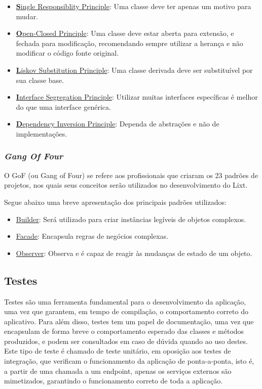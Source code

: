 \begin{itemize}
	\item \underline{\textbf{S}ingle Responsiblity Principle}: Uma classe deve ter apenas um motivo para mudar.
	\item \underline{\textbf{O}pen-Closed Principle}: Uma classe deve estar aberta para extensão, e fechada para modificação, recomendando sempre utilizar a herança e não modificar o código fonte original.
	\item \underline{\textbf{L}iskov Substitution Principle}: Uma classe derivada deve ser substituível por sua classe base.
	\item \underline{\textbf{I}nterface Segregation Principle}: Utilizar muitas interfaces específicas é melhor do que uma interface genérica.
	\item \underline{\textbf{D}ependency Inversion Principle}: Dependa de abstrações e não de implementações.
\end{itemize}

\subsubsection{\emph{Gang Of Four}}

O GoF (ou Gang of Four) se refere aos profissionais que criaram os 23 padrões de projetos, nos quais seus conceitos serão utilizados no desenvolvimento do Lixt.

Segue abaixo uma breve apresentação dos principais padrões utilizados:

\begin{itemize}
	\item \underline{Builder}: Será utilizado para criar instâncias legíveis de objetos complexos.
	\item \underline{Facade}: Encapsula regras de negócios complexas.
	\item \underline{Observer}: Observa e é capaz de reagir às mudanças de estado de um objeto.
\end{itemize}

\subsection{Testes}

Testes são uma ferramenta fundamental para o desenvolvimento da
aplicação, uma vez que garantem, em tempo de compilação, o
comportamento correto do aplicativo. Para além disso, testes tem um
papel de documentação, uma vez que encapsulam de forma breve o
comportamento esperado das classes e métodos produzidos, e podem ser
consultados em caso de dúvida quando ao uso destes. Este tipo de teste
é chamado de teste unitário, em oposição aos testes de integração, que
verificam o funcionamento da aplicação de ponta-a-ponta, isto é, a
partir de uma chamada a um endpoint, apenas os serviços externos são
mimetizados, garantindo o funcionamento correto de toda a aplicação.

